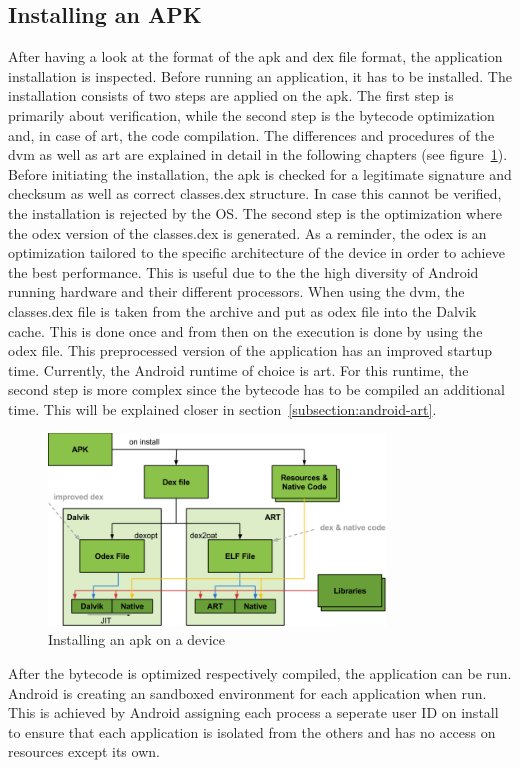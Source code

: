 \subsection{Installing an APK} \label{subsection:android-install}
After having a look at the format of the \gls{apk} and \gls{dex} file format, the application installation is inspected.
Before running an application, it has to be installed.
The installation consists of two steps are applied on the \gls{apk}.
The first step is primarily about verification, while the second step is the bytecode optimization and, in case of \gls{art}, the code compilation.
The differences and procedures of the \gls{dvm} as well as \gls{art} are explained in detail in the following chapters (see figure~\ref{fig:install}).
Before initiating the installation, the \gls{apk} is checked for a legitimate signature and checksum as well as correct classes.dex structure.
\newline
In case this cannot be verified, the installation is rejected by the OS.
The second step is the optimization where the \gls{odex} version of the classes.dex is generated.
As a reminder, the \gls{odex} is an optimization tailored to the specific architecture of the device in order to achieve the best performance.
This is useful due to the the high diversity of Android running hardware and their different processors.
When using the \gls{dvm}, the classes.dex file is taken from the archive and put as \gls{odex} file into the Dalvik cache.
This is done once and from then on the execution is done by using the \gls{odex} file.
This preprocessed version of the application has an improved startup time. \cite{kovachevaMaster}
\newline
Currently, the Android runtime of choice is \gls{art}.
For this runtime, the second step is more complex since the bytecode has to be compiled an additional time.
This will be explained closer in section~\ref{subsection:android-art}.
\newline
\begin{figure}[h]
    \centering
    \includegraphics[width=0.8\textwidth]{data/install.png}
    \caption{Installing an \gls{apk} on a device \cite{googleIOArt}}
    \label{fig:install}
\end{figure}
After the bytecode is optimized respectively compiled, the application can be run.
Android is creating an sandboxed environment for each application when run.
This is achieved by Android assigning each process a seperate user ID on install to ensure that each application is isolated from the others and has no access on resources except its own. \cite{developerFundamentals}
